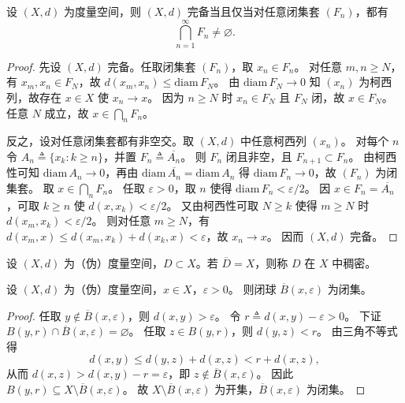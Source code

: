 \documentclass[lang=cn,a4paper,newtx,section]{elegantbook}
\begin{document}
\begin{theorem}
  设 $(X,d)$ 为度量空间，则 $(X,d)$ 完备当且仅当对任意闭集套 $(F_n)$，都有
  \[
    \bigcap_{n=1}^{\infty} F_n\ne\varnothing.
  \]
\end{theorem}

\begin{proof}
  先设 $(X,d)$ 完备。任取闭集套 $(F_n)$，取 $x_n\in F_n$。
  对任意 $m,n\ge N$，有 $x_m,x_n\in F_N$，故 $d(x_m,x_n)\le \mathrm{diam}\,F_N$。
  由 $\mathrm{diam}\,F_N\to 0$ 知 $(x_n)$ 为柯西列，故存在 $x\in X$ 使 $x_n\to x$。
  因为 $n\ge N$ 时 $x_n\in F_N$ 且 $F_N$ 闭，故 $x\in F_N$。
  任意 $N$ 成立，故 $x\in\bigcap_n F_n$。

  反之，设对任意闭集套都有非空交。取 $(X,d)$ 中任意柯西列 $(x_n)$。
  对每个 $n$ 令 $A_n\triangleq \{x_k: k\ge n\}$，并置 $F_n\triangleq \overline{A_n}$。
  则 $F_n$ 闭且非空，且 $F_{n+1}\subset F_n$。
  由柯西性可知 $\mathrm{diam}\,A_n\to 0$，再由 $\mathrm{diam}\,\overline{A_n}=\mathrm{diam}\,A_n$ 得 $\mathrm{diam}\,F_n\to 0$，故 $(F_n)$ 为闭集套。
  取 $x\in\bigcap_n F_n$。
  任取 $\varepsilon>0$，取 $n$ 使得 $\mathrm{diam}\,F_n<\varepsilon/2$。
  因 $x\in F_n=\overline{A_n}$，可取 $k\ge n$ 使 $d(x,x_k)<\varepsilon/2$。
  又由柯西性可取 $N\ge k$ 使得 $m\ge N$ 时 $d(x_m,x_k)<\varepsilon/2$。
  则对任意 $m\ge N$，有 $d(x_m,x)\le d(x_m,x_k)+d(x_k,x)<\varepsilon$，故 $x_n\to x$。
  因而 $(X,d)$ 完备。
\end{proof}

\begin{definition}
  设 $(X,d)$ 为（伪）度量空间，$D\subset X$。若 $\overline{D}=X$，则称 $D$ 在 $X$ 中稠密。
\end{definition}

\begin{proposition}\label{prop:closed-ball-closed}
  设 $(X,d)$ 为（伪）度量空间，$x\in X$，$\varepsilon>0$。
  则闭球 $\overline{B}(x,\varepsilon)$ 为闭集。
\end{proposition}

\begin{proof}
  任取 $y\notin \overline{B}(x,\varepsilon)$，则 $d(x,y)>\varepsilon$。
  令 $r\triangleq d(x,y)-\varepsilon>0$。
  下证 $B(y,r)\cap\overline{B}(x,\varepsilon)=\varnothing$。
  任取 $z\in B(y,r)$，则 $d(y,z)<r$。
  由三角不等式得
  \[
    d(x,y)\le d(y,z)+d(x,z)<r+d(x,z),
  \]
  从而 $d(x,z)>d(x,y)-r=\varepsilon$，即 $z\notin\overline{B}(x,\varepsilon)$。
  因此 $B(y,r)\subseteq X\setminus\overline{B}(x,\varepsilon)$。
  故 $X\setminus\overline{B}(x,\varepsilon)$ 为开集，$\overline{B}(x,\varepsilon)$ 为闭集。
\end{proof}
\end{document}
